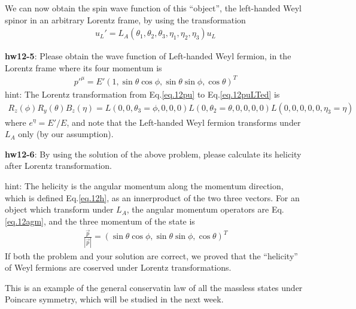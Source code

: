 \documentclass[12pt]{article}
\begin{document}
  We can now obtain the spin wave function of this ``object'', the
  left-handed Weyl spinor in an arbitrary Lorentz frame, by using
  the transformation
\begin{eqnarray}
  u_L' = L_A(\theta_1,\theta_2,\theta_3,\eta_1,\eta_2,\eta_3) u_L
\end{eqnarray}
 
{\bf hw12-5}: Please obtain the wave function of Left-handed Weyl fermion,
  in the Lorentz frame where its four momentum is
\begin{eqnarray}
  {p'}^\mu
  = E' (1, \sin\theta\cos\phi, \sin\theta\sin\phi, \cos\theta)^T \label{eq.12puLTed}
\end{eqnarray}
  hint: The Lorentz transformation from Eq.\ref{eq.12pu} to Eq.\ref{eq.12puLTed} is
\begin{eqnarray}
  R_z(\phi)  R_y(\theta)  B_z(\eta)
  =
  L(0,0,\theta_3=\phi,0,0,0) L(0,\theta_2=\theta,0,0,0,0) L(0,0,0,0,0,\eta_3=\eta)
\end{eqnarray}
  where $e^\eta = E'/E$, and note that the Left-handed Weyl fermion
  transforms under $L_A$ only (by our assumption).

{\bf hw12-6}: By using the solution of the above problem, please calculate
  its helicity after Lorentz transformation.

hint: The helicity is the angular momentum along the momentum direction,
  which is defined Eq.\ref{eq.12h}, as an innerproduct of the two three vectors.
  For an object which transform under $L_A$, the angular momentum
  operators are Eq.\ref{eq.12agm}, and the three momentum of the state is
\begin{eqnarray}
  \frac{\vec p}{|\vec p|}
  = (\sin\theta\cos\phi, \sin\theta\sin\phi, \cos\theta)^T\label{eq.12pvp}
\end{eqnarray}
  If both the problem and your solution are correct, we proved that the
  ``helicity'' of Weyl fermions are coserved under Lorentz transformations.

  This is an example of the general conservatin law of all the massless
  states under Poincare symmetry, which will be studied in the next week.
\end{document}
